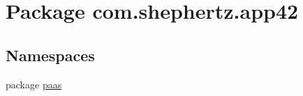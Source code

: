 \hypertarget{namespacecom_1_1shephertz_1_1app42}{\section{Package com.\+shephertz.\+app42}
\label{namespacecom_1_1shephertz_1_1app42}
}
\subsection*{Namespaces}
\begin{DoxyCompactItemize}
\item 
package \hyperlink{namespacecom_1_1shephertz_1_1app42_1_1paas}{paas}
\end{DoxyCompactItemize}

